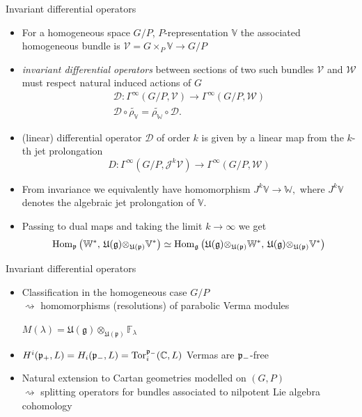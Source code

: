 \documentclass[10pt]{beamer}
\begin{document}
\begin{frame}{Invariant differential operators}
\begin{itemize}[<+- | alert@+>]
	\item For a homogeneous space $G/P$, $P$-representation $\mathbb{V}$ the associated homogeneous bundle is $\mathcal{V} = G \times_P \mathbb{V} \to G/P$
	\item \emph{invariant differential operators} between sections of two such bundles $\mathcal{V}$ and $\mathcal{W}$ must respect natural induced actions of $G$
	\begin{gather*}
\mathcal{D} \colon \Gamma^\infty(G/P, \mathcal{V}) \to \Gamma^\infty(G/P, \mathcal{W}) \\
\mathcal{D} \circ \widetilde{\rho_\mathbb{V}} =  \widetilde{\rho_\mathbb{W}} \circ \mathcal{D}.
\end{gather*}
\item (linear) differential operator $\mathcal{D}$ of order $k$ is given by a linear map from the $k$-th jet prolongation 
\[
D\colon \Gamma^\infty(G/P,\mathcal{J}^k \mathcal{V}) \to \Gamma^\infty(G/P, \mathcal{W})
\]
\item From invariance we equivalently have homomorphism $J^k \mathbb{V} \to \mathbb{W},$ where  $J^k \mathbb{V}$ denotes the algebraic jet prolongation of $\mathbb{V}.$
\item Passing to dual maps and taking the limit $k \to \infty$ we get 
\[
\mathrm{Hom}_{\mathfrak{p}}\left(\mathbb{W}^*, \, \mathfrak{U(g)\otimes_{U(p)}}\mathbb{V}^*\right) \simeq \mathrm{Hom}_{\mathfrak{g}}\left(\mathfrak{U(g)\otimes_{U(p)}}\mathbb{W}^*, \, \mathfrak{U(g)\otimes_{U(p)}}\mathbb{V}^*\right)
\]
\end{itemize}
 

\end{frame}


\begin{frame}{Invariant differential operators}
\begin{itemize}[<+- | alert@+>]
\item Classification in the homogeneous case $G/P$\\
 $\rightsquigarrow$ homomorphisms (resolutions) of parabolic Verma modules \\
 \begin{center}
 $M(\lambda) = \mathfrak{U(g)\otimes_{U(p)}}\mathbb{F}_\lambda$
 \end{center}
\item $H^i(\mathfrak{p}_+, L) = H_i(\mathfrak{p}_-, L) = \mathrm{Tor}_i^{\mathfrak{p}_-}(\mathbb{C}, L)$ \et Vermas are $\mathfrak{p}_-$-free
\item Natural extension to Cartan geometries modelled on $(G, P)$\\
 $\rightsquigarrow$ splitting operators for bundles associated to nilpotent Lie algebra cohomology
\end{itemize}
\end{frame}
\end{document}

